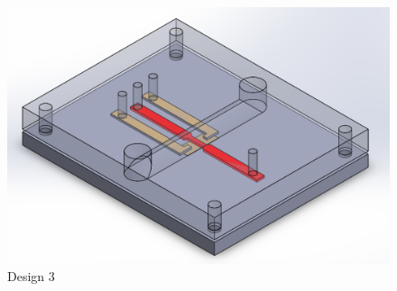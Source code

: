 \begin{figure}[H]
    \centering
    \includegraphics[scale = 0.3]{images/Design4}
    \caption{Design 3}
    \label{fig:design4}
\end{figure}

